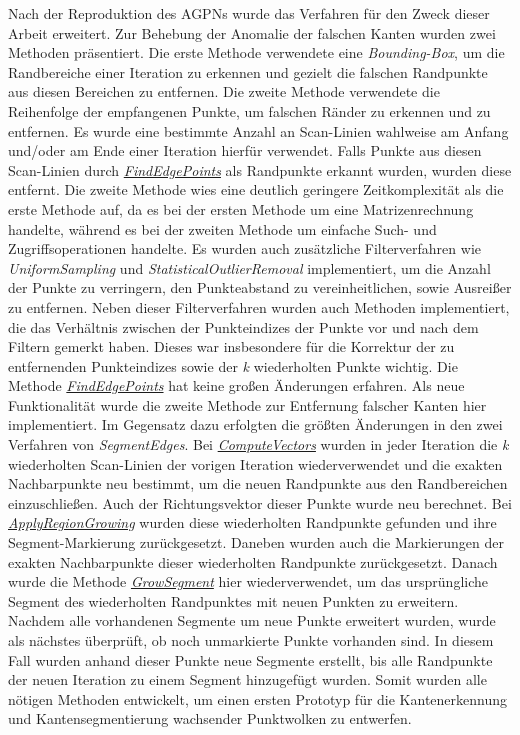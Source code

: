 Nach der Reproduktion des AGPNs wurde das Verfahren für den Zweck dieser Arbeit erweitert. Zur Behebung der Anomalie der falschen Kanten wurden zwei Methoden präsentiert. Die erste Methode verwendete eine \textit{Bounding-Box}, um die Randbereiche einer Iteration zu erkennen und gezielt die falschen Randpunkte aus diesen Bereichen zu entfernen. Die zweite Methode verwendete die Reihenfolge der empfangenen Punkte, um falschen Ränder zu erkennen und zu entfernen. Es wurde eine bestimmte Anzahl an Scan-Linien wahlweise am Anfang und/oder am Ende einer Iteration hierfür verwendet. Falls Punkte aus diesen Scan-Linien durch \textit{\hyperref[alg:find_edge_points]{FindEdgePoints}} als Randpunkte erkannt wurden, wurden diese entfernt. Die zweite Methode wies eine deutlich geringere Zeitkomplexität als die erste Methode auf, da es bei der ersten Methode um eine Matrizenrechnung handelte, während es bei der zweiten Methode um einfache Such- und Zugriffsoperationen handelte. Es wurden auch zusätzliche Filterverfahren wie \textit{UniformSampling} und \textit{StatisticalOutlierRemoval} \autocite{rusu_3d_2011} \autocite{rusu_towards_2008} implementiert, um die Anzahl der Punkte zu verringern, den Punkteabstand zu vereinheitlichen, sowie Ausreißer zu entfernen. Neben dieser Filterverfahren wurden auch Methoden implementiert, die das Verhältnis zwischen der Punkteindizes der Punkte vor und nach dem Filtern gemerkt haben. Dieses war insbesondere für die Korrektur der zu entfernenden Punkteindizes sowie der \textit{k} wiederholten Punkte wichtig. Die Methode \textit{\hyperref[alg:find_edge_points]{FindEdgePoints}} hat keine großen Änderungen erfahren. Als neue Funktionalität wurde die zweite Methode zur Entfernung falscher Kanten hier implementiert. Im Gegensatz dazu erfolgten die größten Änderungen in den zwei Verfahren von \textit{SegmentEdges}. Bei \textit{\hyperref[alg:compute_vectors]{ComputeVectors}} wurden in jeder Iteration die \textit{k} wiederholten Scan-Linien der vorigen Iteration wiederverwendet und die exakten Nachbarpunkte neu bestimmt, um die neuen Randpunkte aus den Randbereichen einzuschließen. Auch der Richtungsvektor dieser Punkte wurde neu berechnet. Bei \textit{\hyperref[alg:apply_region_growing]{ApplyRegionGrowing}} wurden diese wiederholten Randpunkte gefunden und ihre Segment-Markierung zurückgesetzt. Daneben wurden auch die Markierungen der exakten Nachbarpunkte dieser wiederholten Randpunkte zurückgesetzt. Danach wurde die Methode \textit{\hyperref[alg:grow_segment]{GrowSegment}} hier wiederverwendet, um das ursprüngliche Segment des wiederholten Randpunktes mit neuen Punkten zu erweitern. Nachdem alle vorhandenen Segmente um neue Punkte erweitert wurden, wurde als nächstes überprüft, ob noch unmarkierte Punkte vorhanden sind. In diesem Fall wurden anhand dieser Punkte neue Segmente erstellt, bis alle Randpunkte der neuen Iteration zu einem Segment hinzugefügt wurden. Somit wurden alle nötigen Methoden entwickelt, um einen ersten Prototyp für die Kantenerkennung und Kantensegmentierung wachsender Punktwolken zu entwerfen.

